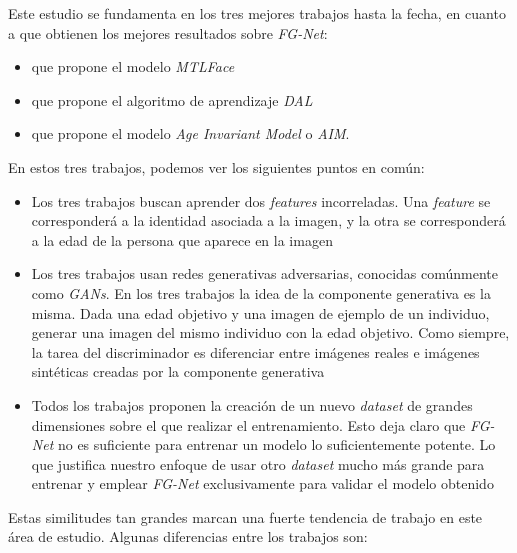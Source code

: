Este estudio se fundamenta en los tres mejores trabajos hasta la fecha, en cuanto a que obtienen los mejores resultados sobre \textit{FG-Net}:

\begin{itemize}
    \item {} \cite{informatica:best_fgnet_model} que propone el modelo \textit{MTLFace}
    \item {} \cite{informatica:dal} que propone el algoritmo de aprendizaje \textit{DAL}
    \item {} \cite{informatica:aim} que propone el modelo \textit{Age Invariant Model} o \textit{AIM}.
\end{itemize}

En estos tres trabajos, podemos ver los siguientes puntos en común:

\begin{itemize}
    \item Los tres trabajos buscan aprender dos \textit{features} incorreladas. Una \textit{feature} se corresponderá a la identidad asociada a la imagen, y la otra se corresponderá a la edad de la persona que aparece en la imagen
    \item Los tres trabajos usan redes generativas adversarias, conocidas comúnmente como \textit{GANs}. En los tres trabajos la idea de la componente generativa es la misma. Dada una edad objetivo y una imagen de ejemplo de un individuo, generar una imagen del mismo individuo con la edad objetivo. Como siempre, la tarea del discriminador es diferenciar entre imágenes reales e imágenes sintéticas creadas por la componente generativa
    \item Todos los trabajos proponen la creación de un nuevo \textit{dataset} de grandes dimensiones sobre el que realizar el entrenamiento. Esto deja claro que \textit{FG-Net} no es suficiente para entrenar un modelo lo suficientemente potente. Lo que justifica nuestro enfoque de usar otro \textit{dataset} mucho más grande para entrenar y emplear \textit{FG-Net} exclusivamente para validar el modelo obtenido
\end{itemize}

Estas similitudes tan grandes marcan una fuerte tendencia de trabajo en este área de estudio. Algunas diferencias entre los trabajos son:

